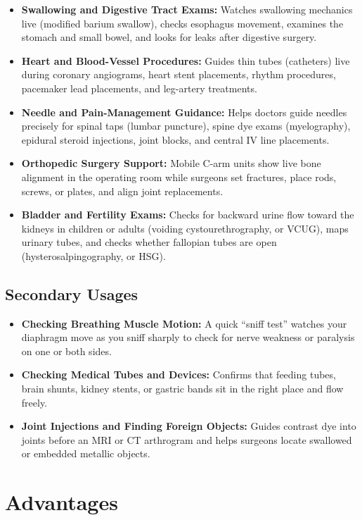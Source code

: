 \begin{itemize}
    \item \textbf{Swallowing and Digestive Tract Exams:} Watches swallowing mechanics live (modified barium swallow), checks esophagus movement, examines the stomach and small bowel, and looks for leaks after digestive surgery.
    \item \textbf{Heart and Blood-Vessel Procedures:} Guides thin tubes (catheters) live during coronary angiograms, heart stent placements, rhythm procedures, pacemaker lead placements, and leg-artery treatments.
    \item \textbf{Needle and Pain-Management Guidance:} Helps doctors guide needles precisely for spinal taps (lumbar puncture), spine dye exams (myelography), epidural steroid injections, joint blocks, and central IV line placements.
    \item \textbf{Orthopedic Surgery Support:} Mobile C-arm units show live bone alignment in the operating room while surgeons set fractures, place rods, screws, or plates, and align joint replacements.
    \item \textbf{Bladder and Fertility Exams:} Checks for backward urine flow toward the kidneys in children or adults (voiding cystourethrography, or VCUG), maps urinary tubes, and checks whether fallopian tubes are open (hysterosalpingography, or HSG).
\end{itemize}

\subsection{Secondary Usages}

\begin{itemize}
    \item \textbf{Checking Breathing Muscle Motion:} A quick ``sniff test'' watches your diaphragm move as you sniff sharply to check for nerve weakness or paralysis on one or both sides.
    \item \textbf{Checking Medical Tubes and Devices:} Confirms that feeding tubes, brain shunts, kidney stents, or gastric bands sit in the right place and flow freely.
    \item \textbf{Joint Injections and Finding Foreign Objects:} Guides contrast dye into joints before an MRI or CT arthrogram and helps surgeons locate swallowed or embedded metallic objects.
\end{itemize}

\section{Advantages}

